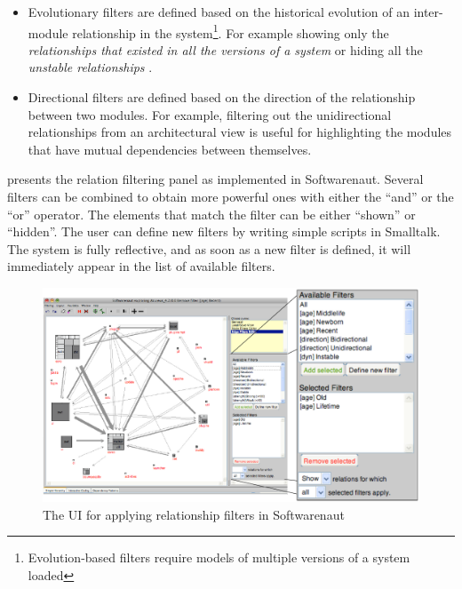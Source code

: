 \documentclass[preprint,12pt]{elsarticle}
\begin{document}
\begin{itemize}
\item Evolutionary filters are defined based on the historical evolution of an inter-module relationship in the system\footnote{Evolution-based filters require models of multiple versions of a system loaded}. %
For example showing only the {\em relationships that existed in all the versions of a system} or hiding all the {\em unstable relationships} \cite{lungu-relevo}.


\item Directional filters are defined based on the direction of the relationship between two modules. For example, filtering out the unidirectional relationships from an architectural view is useful for highlighting the modules that have mutual dependencies between themselves. 
\end{itemize}


 presents the relation filtering panel as implemented in Softwarenaut. Several filters can be combined to obtain more powerful ones with either the ``and'' or the ``or'' operator. The elements that match the filter can be either ``shown'' or ``hidden''. The user can define new filters by writing simple scripts in Smalltalk. The system is fully reflective, and as soon as a new filter is defined, it will immediately appear in the list of available filters.

\begin{figure}[h]
\begin{center}
\includegraphics[width=\linewidth]{images/SnautFilteringPanel}
\caption{The UI for applying relationship filters in Softwarenaut}
\end{center}
\end{figure}
\end{document}

